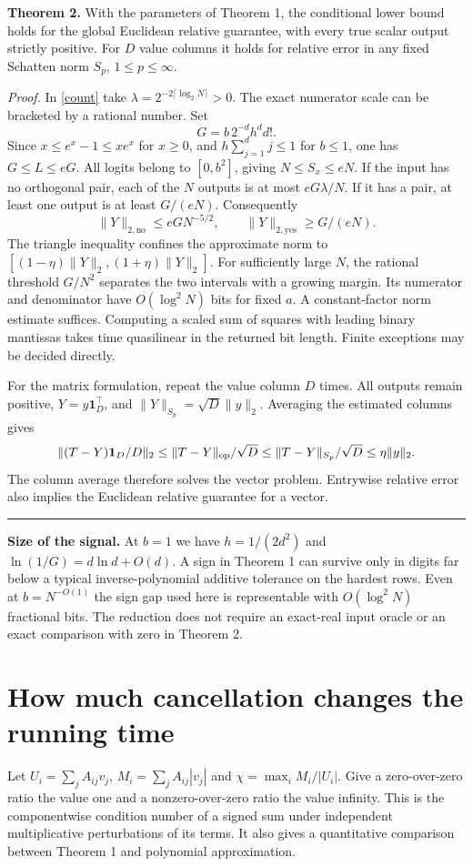 \documentclass[11pt,letterpaper]{article}
\newcommand{\one}{\mathbf 1}\newcommand{\abs}[1]{\lvert#1\rvert}
\newcommand{\norm}[1]{\lVert#1\rVert}
\newcommand{\qedmark}{\unskip\nobreak\hfill\rule{0.5em}{0.5em}}
\newcommand{\result}[1]{\smallskip\textbf{#1}\enspace}
\begin{document}
\result{Theorem 2.} With the parameters of Theorem 1, the conditional lower bound holds for the global Euclidean relative guarantee, with every true scalar output strictly positive. For $D$ value columns it holds for relative error in any fixed Schatten norm $S_p$, $1\le p\le\infty$.

\textit{Proof.} In \eqref{count} take $\lambda=2^{-2\lceil\log_2 N\rceil}>0$. The exact numerator scale can be bracketed by a rational number. Set
\[
 G=b\,2^{-d} h^d d!.
\]
Since $x\le e^x-1\le xe^x$ for $x\ge0$, and $h\sum_{j=1}^d j\le1$ for $b\le1$, one has $G\le L\le eG$. All logits belong to $[0,b^2]$, giving $N\le S_x\le eN$. If the input has no orthogonal pair, each of the $N$ outputs is at most $e G\lambda/N$. If it has a pair, at least one output is at least $G/(eN)$. Consequently
\begin{equation}
 \norm{Y}_{2,\mathrm{no}}\le eG N^{-5/2},\qquad
 \norm{Y}_{2,\mathrm{yes}}\ge G/(eN). \label{gap}
\end{equation}
The triangle inequality confines the approximate norm to
$[(1-\eta)\norm Y_2,(1+\eta)\norm Y_2]$. For sufficiently large $N$, the rational threshold $G/N^2$ separates the two intervals with a growing margin. Its numerator and denominator have $O(\log^2 N)$ bits for fixed $a$. A constant-factor norm estimate suffices. Computing a scaled sum of squares with leading binary mantissas takes time quasilinear in the returned bit length. Finite exceptions may be decided directly.

For the matrix formulation, repeat the value column $D$ times. All outputs remain positive, $Y=y\one_D^\top$, and $\norm Y_{S_p}=\sqrt D\norm y_2$. Averaging the estimated columns gives
\[
 \norm{(T-Y)\one_D/D}_2\le\norm{T-Y}_{\rm op}/\sqrt D\le\norm{T-Y}_{S_p}/\sqrt D
 \le\eta\norm y_2 .
\]
The column average therefore solves the vector problem. Entrywise relative error also implies the Euclidean relative guarantee for a vector. \qedmark

\result{Size of the signal.} At $b=1$ we have $h=1/(2d^2)$ and $\ln(1/G)=d\ln d+O(d)$. A sign in Theorem 1 can survive only in digits far below a typical inverse-polynomial additive tolerance on the hardest rows. Even at $b=N^{-O(1)}$ the sign gap used here is representable with $O(\log^2 N)$ fractional bits. The reduction does not require an exact-real input oracle or an exact comparison with zero in Theorem 2.
\newpage

\section{How much cancellation changes the running time}
Let $U_i=\sum_j A_{ij}v_j$, $M_i=\sum_j A_{ij}|v_j|$ and $\chi=\max_i M_i/|U_i|$. Give a zero-over-zero ratio the value one and a nonzero-over-zero ratio the value infinity. This is the componentwise condition number of a signed sum under independent multiplicative perturbations of its terms. It also gives a quantitative comparison between Theorem 1 and polynomial approximation.
\end{document}
